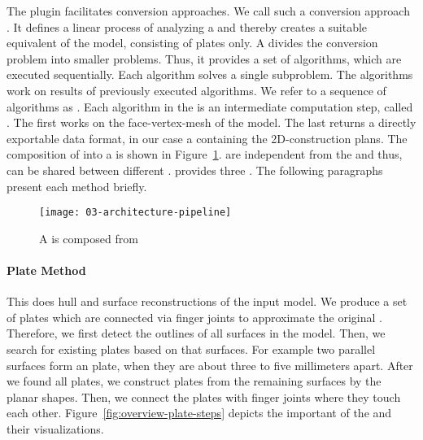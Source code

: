 \documentclass[../../ClassicThesis.tex]{subfiles}
\begin{document}
The  plugin facilitates conversion
approaches. We call such a conversion approach
\class{\fabmethod}.
It defines a linear process of analyzing a {\threedmodel}
and thereby creates a suitable equivalent of the model,
consisting of plates only. A \class{\fabmethod}
divides the conversion problem into smaller problems. Thus,
it provides a set of algorithms, which are executed
sequentially. Each algorithm solves a single subproblem. The
algorithms work on results of previously executed
algorithms. We refer to a sequence of algorithms as
. Each algorithm in the  is
an intermediate computation step, called
. The first  works
on the face-vertex-mesh of the model. The last
 returns a directly exportable data
format, in our case a {\zipfile} containing the
2D-construction plans. The composition of
 into a  is shown in
Figure~\ref{fig:pipeline-from-steps}. 
are independent from the \class{\fabmethod} and thus, can be
shared between different . {\platener}
provides three . The following paragraphs
present each method briefly.

\begin{figure}[h]
\centering
\texttt{[image: 03-architecture-pipeline]}
\caption{A  is composed from
  }
\label{fig:pipeline-from-steps}
\end{figure}

\paragraph{Plate Method}

This \class{\fabmethod} does hull and surface reconstructions of the
input model. We produce a set of plates which are connected via finger
joints to approximate the original {\threedmodel}. Therefore, we first
detect the outlines of all surfaces in the model. Then, we search for
existing plates based on that surfaces. For example two parallel
surfaces form an  plate, when they are about three to
five millimeters apart. After we found all  plates, we
construct plates from the remaining surfaces by  the
planar shapes. Then, we connect the plates with finger joints where
they touch each other. Figure~\ref{fig:overview-plate-steps} depicts
the important  of the  and
their visualizations.
\end{document}
